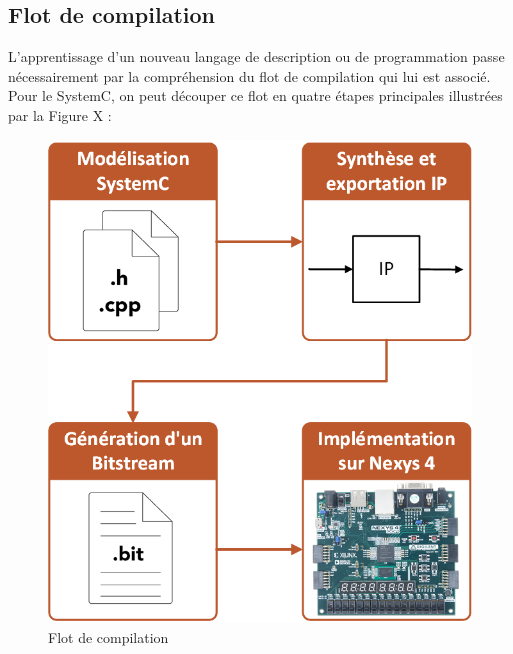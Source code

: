 \documentclass[a4paper,12pt]{article}
\begin{document}
\subsection{Flot de compilation}
L'apprentissage d'un nouveau langage de description ou de programmation passe nécessairement par la compréhension du flot de compilation qui lui est associé. Pour le SystemC, on peut découper ce flot en quatre étapes principales illustrées par la Figure X :
\begin{figure}[H]
\centering
\includegraphics[scale=0.5, keepaspectratio]{Dessin2.png}
\caption{Flot de compilation}
\end{figure}
\end{document}
